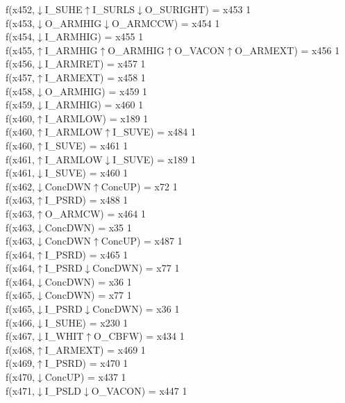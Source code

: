 f(x452,$\downarrow$I\_SUHE$\uparrow$I\_SURLS$\downarrow$O\_SURIGHT) = x453 {1} \\
f(x453,$\downarrow$O\_ARMHIG$\downarrow$O\_ARMCCW) = x454 {1} \\
f(x454,$\downarrow$I\_ARMHIG) = x455 {1} \\
f(x455,$\uparrow$I\_ARMHIG$\uparrow$O\_ARMHIG$\uparrow$O\_VACON$\uparrow$O\_ARMEXT) = x456 {1} \\
f(x456,$\downarrow$I\_ARMRET) = x457 {1} \\
f(x457,$\uparrow$I\_ARMEXT) = x458 {1} \\
f(x458,$\downarrow$O\_ARMHIG) = x459 {1} \\
f(x459,$\downarrow$I\_ARMHIG) = x460 {1} \\
f(x460,$\uparrow$I\_ARMLOW) = x189 {1} \\
f(x460,$\uparrow$I\_ARMLOW$\uparrow$I\_SUVE) = x484 {1} \\
f(x460,$\uparrow$I\_SUVE) = x461 {1} \\
f(x461,$\uparrow$I\_ARMLOW$\downarrow$I\_SUVE) = x189 {1} \\
f(x461,$\downarrow$I\_SUVE) = x460 {1} \\
f(x462,$\downarrow$ConcDWN$\uparrow$ConcUP) = x72 {1} \\
f(x463,$\uparrow$I\_PSRD) = x488 {1} \\
f(x463,$\uparrow$O\_ARMCW) = x464 {1} \\
f(x463,$\downarrow$ConcDWN) = x35 {1} \\
f(x463,$\downarrow$ConcDWN$\uparrow$ConcUP) = x487 {1} \\
f(x464,$\uparrow$I\_PSRD) = x465 {1} \\
f(x464,$\uparrow$I\_PSRD$\downarrow$ConcDWN) = x77 {1} \\
f(x464,$\downarrow$ConcDWN) = x36 {1} \\
f(x465,$\downarrow$ConcDWN) = x77 {1} \\
f(x465,$\downarrow$I\_PSRD$\downarrow$ConcDWN) = x36 {1} \\
f(x466,$\downarrow$I\_SUHE) = x230 {1} \\
f(x467,$\downarrow$I\_WHIT$\uparrow$O\_CBFW) = x434 {1} \\
f(x468,$\uparrow$I\_ARMEXT) = x469 {1} \\
f(x469,$\uparrow$I\_PSRD) = x470 {1} \\
f(x470,$\downarrow$ConcUP) = x437 {1} \\
f(x471,$\downarrow$I\_PSLD$\downarrow$O\_VACON) = x447 {1} \\
